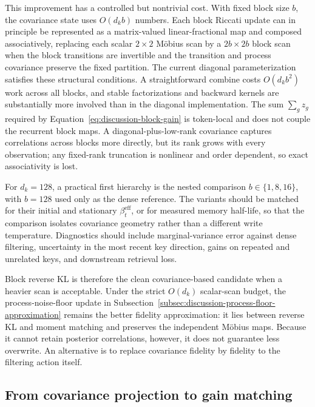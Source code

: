 \documentclass[11pt]{article}
\begin{document}
This improvement has a controlled but nontrivial cost. With fixed block size $b$, the covariance
state uses $O(d_kb)$ numbers. Each block Riccati update can in principle be represented as a
matrix-valued linear-fractional map and composed associatively, replacing each scalar $2\times2$
M\"obius scan by a $2b\times2b$ block scan when the block transitions are invertible and the
transition and process covariance preserve the fixed partition. The current diagonal
parameterization satisfies these structural conditions. A straightforward combine costs
$O(d_kb^2)$ work across all blocks, and stable factorizations and backward kernels are
substantially more involved than in the diagonal implementation. The sum
$\sum_g z_g$ required by Equation~\eqref{eq:discussion-block-gain} is token-local and does not
couple the recurrent block maps. A diagonal-plus-low-rank covariance captures correlations across
blocks more directly, but its rank grows with every observation; any fixed-rank truncation is
nonlinear and order dependent, so exact associativity is lost.

For $d_k=128$, a practical first hierarchy is the nested comparison
$b\in\{1,8,16\}$, with $b=128$ used only as the dense reference. The variants should be matched
for their initial and stationary $\beta_t^{\mathrm{eff}}$, or for measured memory half-life, so
that the comparison isolates covariance geometry rather than a different write temperature.
Diagnostics should include marginal-variance error against dense filtering, uncertainty in the
most recent key direction, gains on repeated and unrelated keys, and downstream retrieval loss.

Block reverse KL is therefore the clean covariance-based candidate when a heavier scan is
acceptable. Under the strict $O(d_k)$ scalar-scan budget, the process-noise-floor update in
Subsection~\ref{subsec:discussion-process-floor-approximation} remains the better fidelity
approximation: it lies between reverse KL and moment matching and preserves the independent
M\"obius maps. Because it cannot retain posterior correlations, however, it does not guarantee
less overwrite. An alternative is to replace covariance fidelity by fidelity to the filtering
action itself.

\subsection{From covariance projection to gain matching}
\label{subsec:discussion-gain-matching}
\end{document}
